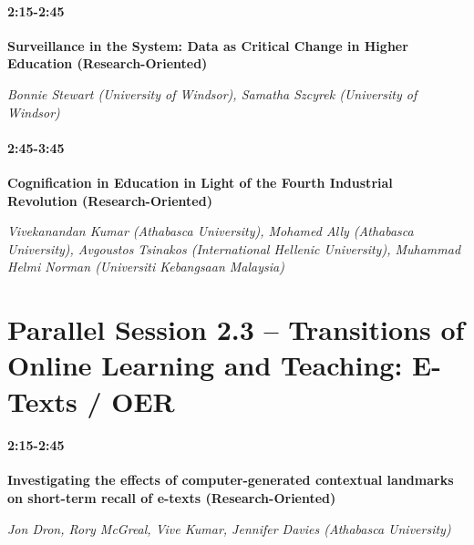 \documentclass[
]{book}
\begin{document}
\begin{secondary}
\hypertarget{section}{%
\paragraph*{2:15-2:45}\label{section}}

\textbf{Surveillance in the System: Data as Critical Change in Higher
Education (Research-Oriented)}

\emph{Bonnie Stewart (University of Windsor), Samatha Szcyrek
(University of Windsor)}
\end{secondary}

\begin{secondary}
\hypertarget{section}{%
\paragraph*{2:45-3:45}\label{section}}

\textbf{Cognification in Education in Light of the Fourth Industrial
Revolution (Research-Oriented)}

\emph{Vivekanandan Kumar (Athabasca University), Mohamed Ally (Athabasca
University), Avgoustos Tsinakos (International Hellenic University),
Muhammad Helmi Norman (Universiti Kebangsaan Malaysia)}
\end{secondary}

\hypertarget{parallel-session-2.3-transitions-of-online-learning-and-teaching-e-texts-oer}{%
\section*{Parallel Session 2.3 -- Transitions of Online Learning and Teaching: E-Texts / OER}\label{parallel-session-2.3-transitions-of-online-learning-and-teaching-e-texts-oer}}

\begin{secondary}
\hypertarget{section}{%
\paragraph*{2:15-2:45}\label{section}}

\textbf{Investigating the effects of computer-generated contextual
landmarks on short-term recall of e-texts (Research-Oriented)}

\emph{Jon Dron, Rory McGreal, Vive Kumar, Jennifer Davies (Athabasca
University)}
\end{secondary}
\end{document}
